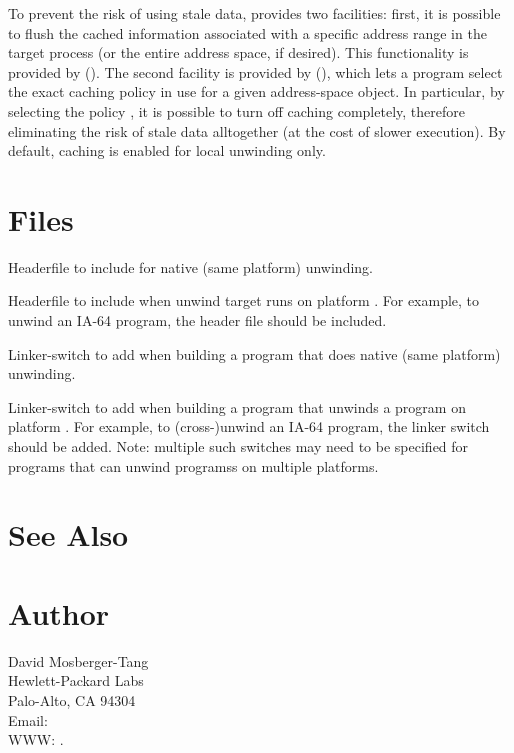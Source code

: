 \documentclass{article}
\begin{document}
To prevent the risk of using stale data,  provides two
facilities: first, it is possible to flush the cached information
associated with a specific address range in the target process (or the
entire address space, if desired).  This functionality is provided by
().  The second facility is provided by
(), which lets a program
select the exact caching policy in use for a given address-space
object.  In particular, by selecting the policy
, it is possible to turn off caching
completely, therefore eliminating the risk of stale data alltogether
(at the cost of slower execution).  By default, caching is enabled for
local unwinding only.


\section{Files}

\begin{Description}
\item[\File{libunwind.h}] Headerfile to include for native (same
  platform) unwinding.
\item[\File{libunwind-}\Var{PLAT}\File{.h}] Headerfile to include when
  unwind target runs on platform .  For example, to unwind
  an IA-64 program, the header file  should be
  included.
\item[\Opt{-l}\File{unwind}] Linker-switch to add when building a
  program that does native (same platform) unwinding.
\item[\Opt{-l}\File{unwind-}\Var{PLAT}] Linker-switch to add when
  building a program that unwinds a program on platform .
  For example, to (cross-)unwind an IA-64 program, the linker switch
   should be added.  Note: multiple such switches
  may need to be specified for programs that can unwind programss on
  multiple platforms.
\end{Description}

\section{See Also}


\section{Author}

\noindent
David Mosberger-Tang\\
Hewlett-Packard Labs\\
Palo-Alto, CA 94304\\
Email: \\
WWW: .
\LatexManEnd
\end{document}
